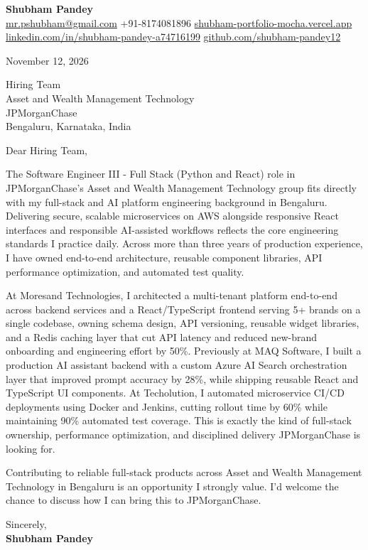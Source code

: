 \documentclass[a4paper,11pt]{article}
\begin{document}
\textbf{\Large Shubham Pandey}\\
\href{mailto:mr.pshubham@gmail.com}{mr.pshubham@gmail.com} \quad +91-8174081896 \quad
\href{https://shubham-portfolio-mocha.vercel.app/}{shubham-portfolio-mocha.vercel.app}\\
\href{https://www.linkedin.com/in/shubham-pandey-a74716199/}{linkedin.com/in/shubham-pandey-a74716199} \quad
\href{https://github.com/shubham-pandey12}{github.com/shubham-pandey12}

\vspace{1em}
November 12, 2026

\vspace{1em}
Hiring Team\\
Asset and Wealth Management Technology\\
JPMorganChase\\
Bengaluru, Karnataka, India

\vspace{1em}
Dear Hiring Team,

The Software Engineer III - Full Stack (Python and React) role in JPMorganChase's Asset and Wealth Management Technology group fits directly with my full-stack and AI platform engineering background in Bengaluru. Delivering secure, scalable microservices on AWS alongside responsive React interfaces and responsible AI-assisted workflows reflects the core engineering standards I practice daily. Across more than three years of production experience, I have owned end-to-end architecture, reusable component libraries, API performance optimization, and automated test quality.

At Moresand Technologies, I architected a multi-tenant platform end-to-end across backend services and a React/TypeScript frontend serving 5+ brands on a single codebase, owning schema design, API versioning, reusable widget libraries, and a Redis caching layer that cut API latency and reduced new-brand onboarding and engineering effort by 50\%. Previously at MAQ Software, I built a production AI assistant backend with a custom Azure AI Search orchestration layer that improved prompt accuracy by 28\%, while shipping reusable React and TypeScript UI components. At Techolution, I automated microservice CI/CD deployments using Docker and Jenkins, cutting rollout time by 60\% while maintaining 90\% automated test coverage. This is exactly the kind of full-stack ownership, performance optimization, and disciplined delivery JPMorganChase is looking for.

Contributing to reliable full-stack products across Asset and Wealth Management Technology in Bengaluru is an opportunity I strongly value. I'd welcome the chance to discuss how I can bring this to JPMorganChase.

\vspace{1em}
Sincerely,\\[0.5em]
\textbf{Shubham Pandey}
\end{document}
